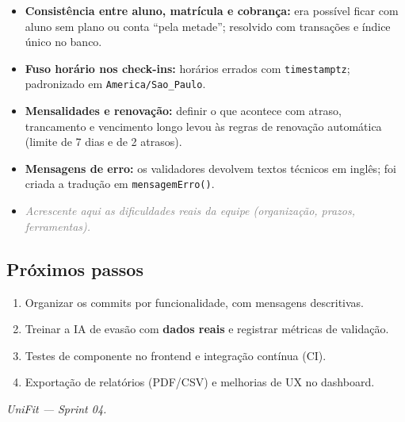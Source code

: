 \documentclass[11pt,a4paper,final]{article}
\newcommand{\cod}[1]{\texttt{#1}}
\newcommand{\preencher}[1]{\textit{\textcolor{gray}{#1}}}
\begin{document}
\begin{itemize}
  \item \textbf{Consistência entre aluno, matrícula e cobrança:} era possível ficar com aluno sem plano ou
        conta ``pela metade''; resolvido com transações e índice único no banco.
  \item \textbf{Fuso horário nos check-ins:} horários errados com \cod{timestamptz}; padronizado em
        \cod{America/Sao\_Paulo}.
  \item \textbf{Mensalidades e renovação:} definir o que acontece com atraso, trancamento e vencimento
        longo levou às regras de renovação automática (limite de 7 dias e de 2 atrasos).
  \item \textbf{Mensagens de erro:} os validadores devolvem textos técnicos em inglês; foi criada a tradução
        em \cod{mensagemErro()}.
  \item \preencher{Acrescente aqui as dificuldades reais da equipe (organização, prazos, ferramentas).}
\end{itemize}

\subsection{Próximos passos}

\begin{enumerate}
  \item Organizar os commits por funcionalidade, com mensagens descritivas.
  \item Treinar a IA de evasão com \textbf{dados reais} e registrar métricas de validação.
  \item Testes de componente no frontend e integração contínua (CI).
  \item Exportação de relatórios (PDF/CSV) e melhorias de UX no dashboard.
\end{enumerate}

\vfill
\begin{center}\small\itshape
 UniFit --- Sprint 04.
\end{center}
\end{document}
